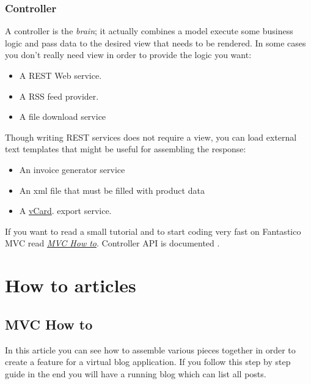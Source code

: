 \documentclass[letterpaper,10pt,english]{sphinxmanual}
\begin{document}
\subsection{Controller}
\label{features/mvc:controller}\label{features/mvc:core-controller-section}
A controller is the \emph{brain}; it actually combines a model execute some business logic and pass data to the desired view
that needs to be rendered. In some cases you don't really need view in order to provide the logic you want:
\begin{itemize}
\item {} 
A REST Web service.

\item {} 
A RSS feed provider.

\item {} 
A file download service

\end{itemize}

Though writing REST services does not require a view, you can load external text templates that might be useful for assembling the
response:
\begin{itemize}
\item {} 
An invoice generator service

\item {} 
An xml file that must be filled with product data

\item {} 
A \href{http://en.wikipedia.org/wiki/VCard}{vCard}. export service.

\end{itemize}

If you want to read a small tutorial and to start coding very fast on Fantastico MVC read {\hyperref[how_to/mvc_how_to::doc]{\emph{MVC How to}}}. Controller
API is documented .


\chapter{How to articles}
\label{how_to/how_to:how-to-articles}\label{how_to/how_to::doc}

\section{MVC How to}
\label{how_to/mvc_how_to::doc}\label{how_to/mvc_how_to:mvc-how-to}
In this article you can see how to assemble various pieces together in order to create a feature for a virtual blog application.
If you follow this step by step guide in the end you will have a running blog which can list all posts.
\end{document}
